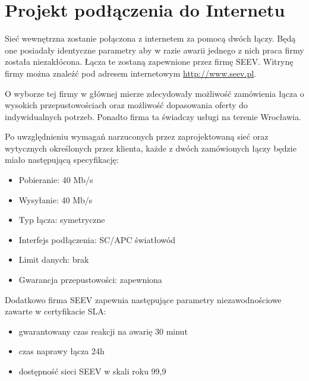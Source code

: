 \documentclass{report}
\begin{document}
\section{Projekt podłączenia do Internetu}

Sieć wewnętrzna zostanie połączona z internetem za pomocą
dwóch łączy. Będą one posiadały identyczne parametry aby w razie awarii jednego z nich praca firmy została niezakłócona. Łącza te zostaną
zapewnione przez firmę SEEV. Witrynę firmy można znaleźć pod adresem internetowym \url{http://www.seev.pl}.

O wyborze tej firmy w głównej mierze zdecydowały
możliwość zamówienia łącza o wysokich przepustowościach oraz możliwość dopasowania oferty do indywidualnych potrzeb.
Ponadto firma ta świadczy usługi na terenie Wrocławia. 

Po uwzględnieniu wymagań narzuconych przez zaprojektowaną sieć oraz wytycznych określonych przez klienta, każde
z dwóch zamówionych łączy będzie miało następującą specyfikację:
\begin{itemize}
 \item Pobieranie: 40 Mb/s
\item Wysyłanie: 40 Mb/s
\item Typ łącza: symetryczne
\item Interfejs podłączenia: SC/APC światłowód
\item Limit danych: brak
\item Gwarancja przepustowości: zapewniona

\end{itemize}

Dodatkowo firma SEEV zapewnia następujące parametry niezawodnościowe zawarte w certyfikacie SLA:
\begin{itemize}
\item gwarantowany czas reakcji na awarię 30 minut
\item czas naprawy łącza 24h
\item dostępność sieci SEEV w skali roku 99,9%
\end{itemize}
\end{document}
